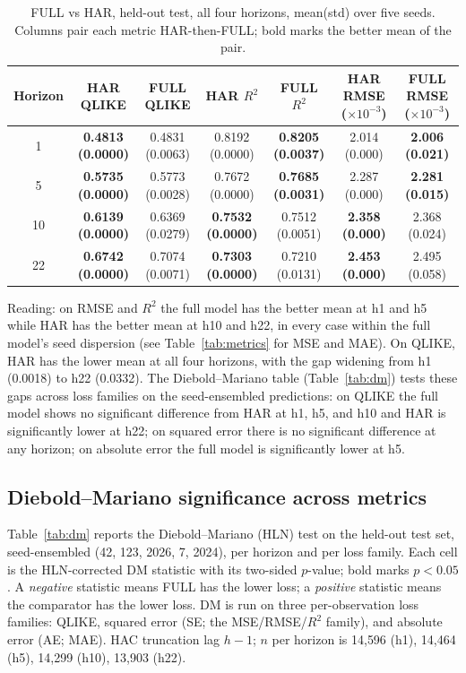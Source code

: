\documentclass[runningheads]{llncs}
\begin{document}
\begin{table}[t]
\caption{FULL vs HAR, held-out test, all four horizons, mean(std) over five seeds. Columns pair each
metric HAR-then-FULL; bold marks the better mean of the pair.}
\label{tab:fullhar}
\centering
\begin{tabular}{ccccccc}
\toprule
Horizon & HAR QLIKE & FULL QLIKE & HAR $R^2$ & FULL $R^2$
 & HAR RMSE ($\times10^{-3}$) & FULL RMSE ($\times10^{-3}$) \\
\midrule
1  & \textbf{0.4813 (0.0000)} & 0.4831 (0.0063) & 0.8192 (0.0000) & \textbf{0.8205 (0.0037)} & 2.014 (0.000) & \textbf{2.006 (0.021)} \\
5  & \textbf{0.5735 (0.0000)} & 0.5773 (0.0028) & 0.7672 (0.0000) & \textbf{0.7685 (0.0031)} & 2.287 (0.000) & \textbf{2.281 (0.015)} \\
10 & \textbf{0.6139 (0.0000)} & 0.6369 (0.0279) & \textbf{0.7532 (0.0000)} & 0.7512 (0.0051) & \textbf{2.358 (0.000)} & 2.368 (0.024) \\
22 & \textbf{0.6742 (0.0000)} & 0.7074 (0.0071) & \textbf{0.7303 (0.0000)} & 0.7210 (0.0131) & \textbf{2.453 (0.000)} & 2.495 (0.058) \\
\bottomrule
\end{tabular}
\end{table}

Reading: on RMSE and $R^2$ the full model has the better mean at h1 and h5 while HAR has the better mean at
h10 and h22, in every case within the full model's seed dispersion (see Table~\ref{tab:metrics} for MSE and
MAE). On QLIKE, HAR has the lower mean at all four horizons, with the gap widening from h1 (0.0018) to h22
(0.0332). The Diebold--Mariano table (Table~\ref{tab:dm}) tests these gaps across loss families on the
seed-ensembled predictions: on QLIKE the full model shows no significant difference from HAR at h1, h5, and
h10 and HAR is significantly lower at h22; on squared error there is no significant difference at any
horizon; on absolute error the full model is significantly lower at h5.

\subsection{Diebold--Mariano significance across metrics}
\label{sec:results-dm}
Table~\ref{tab:dm} reports the Diebold--Mariano (HLN) test on the held-out test set, seed-ensembled
(42, 123, 2026, 7, 2024), per horizon and per loss family. Each cell is the HLN-corrected DM statistic with
its two-sided $p$-value; bold marks $p<0.05$. A \emph{negative} statistic means FULL has the lower loss; a
\emph{positive} statistic means the comparator has the lower loss. DM is run on three per-observation loss
families: QLIKE, squared error (SE; the MSE/RMSE/$R^2$ family), and absolute error (AE; MAE). HAC
truncation lag $h{-}1$; $n$ per horizon is 14{,}596 (h1), 14{,}464 (h5), 14{,}299 (h10), 13{,}903 (h22).
\end{document}
